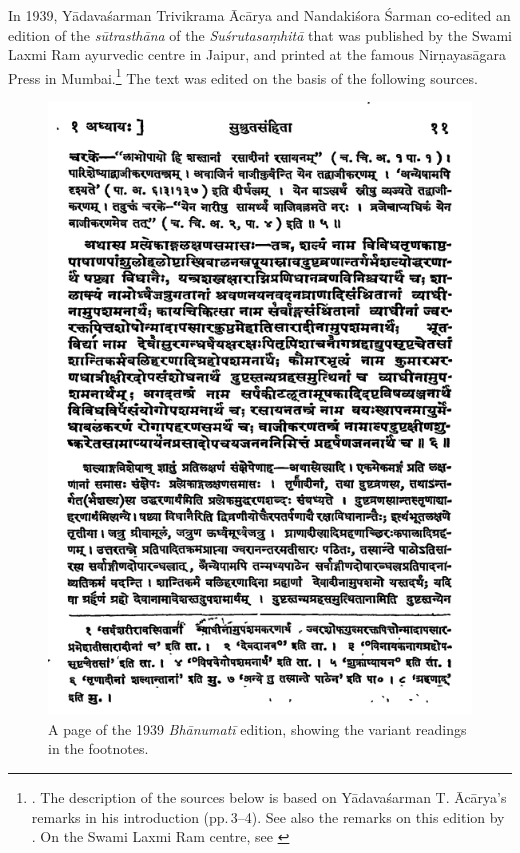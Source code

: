 In 1939, Yādavaśarman Trivikrama Ācārya and Nandakiśora Śarman co-edited an
edition of the \emph{sūtrasthāna} of the \emph{Suśrutasaṃhitā} that was published
by the Swami Laxmi Ram ayurvedic centre in Jaipur, and printed at the famous
Nirṇayasāgara Press in Mumbai.\footnote{\cite{acar-1939}.  The description of the sources 
below is based on Yādavaśarman T. Ācārya's  remarks in his introduction 
(pp.\,3--4). See also the remarks on this edition by
\citet[7]{kleb-2021a}.  On the Swami Laxmi Ram
centre, see \cite{hofe-2007}} The text was edited on the basis of the following sources.
\begin{figure}[p]
    \centering
    \includegraphics[height=.9\textheight]{media/Bhanumati-page-11}
    \caption{A page of the 1939 \emph{Bhānumatī} edition, showing the variant readings in 
        the 
        footnotes.}
    \label{fig:bhanumati-page-11}
\end{figure}


